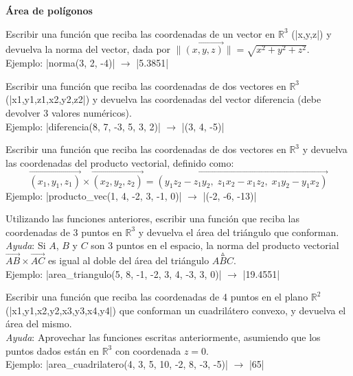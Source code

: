 \begin{ejercicio}
{\bf Área de polígonos}
\begin{partes}
    \item Escribir una función que reciba las coordenadas de un vector en
        $\mathbb{R}^3$ (|x,y,z|) y devuelva la norma del vector, dada por
        $\lVert\overrightarrow{(x,y,z)}\rVert=\sqrt{x^2+y^2+z^2}$. \\
        Ejemplo: |norma(3, 2, -4)| $\rightarrow$ |5.3851|

    \item Escribir una función que reciba las coordenadas de dos vectores en
        $\mathbb{R}^3$ (|x1,y1,z1,x2,y2,z2|) y devuelva las coordenadas del vector
        diferencia (debe devolver 3 valores numéricos). \\
        Ejemplo: |diferencia(8, 7, -3, 5, 3, 2)| $\rightarrow$ |(3, 4, -5)|

    \item Escribir una función que reciba las coordenadas de dos vectores en
        $\mathbb{R}^3$ y devuelva las coordenadas del producto vectorial,
        definido como:
        $$\overrightarrow{(x_1, y_1, z_1)} \times \overrightarrow{(x_2, y_2, z_2)} =
        \overrightarrow{(y_1 z_2 - z_1 y_2, \; z_1 x_2 - x_1 z_2, \; x_1 y_2 - y_1 x_2)}$$
        Ejemplo: |producto_vec(1, 4, -2, 3, -1, 0)| $\rightarrow$ |(-2, -6, -13)|

    \item Utilizando las funciones anteriores, escribir una función que reciba
        las coordenadas de 3 puntos en $\mathbb{R}^3$ y devuelva el área del triángulo
        que conforman.\\
        \emph{Ayuda}: Si $A$, $B$ y $C$ son 3 puntos en el espacio, la norma del producto
        vectorial $\overrightarrow{AB} \times \overrightarrow{AC}$ es igual al doble del área del
        triángulo $\stackrel{\vartriangle}{ABC}$. \\
        Ejemplo: |area_triangulo(5, 8, -1, -2, 3, 4, -3, 3, 0)| $\rightarrow$ |19.4551|

    \item Escribir una función que reciba las coordenadas de 4 puntos en el
        plano $\mathbb{R}^2$ (|x1,y1,x2,y2,x3,y3,x4,y4|) que conforman un cuadrilátero
        convexo, y devuelva el área del mismo. \\
        \emph{Ayuda}: Aprovechar las funciones escritas anteriormente, asumiendo
        que los puntos dados están en $\mathbb{R}^3$ con coordenada $z = 0$. \\
        Ejemplo: |area_cuadrilatero(4, 3, 5, 10, -2, 8, -3, -5)| $\rightarrow$
        |65|
\end{partes}
\end{ejercicio}
